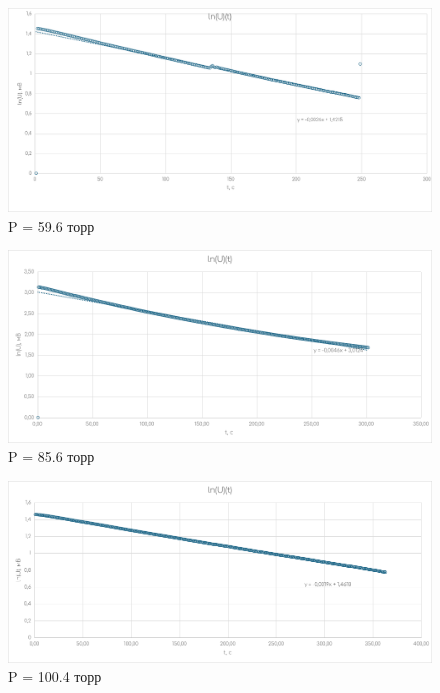 \documentclass[a4paper, 10pt, twocolumn]{article}
\begin{document}
\begin{figure}[H]
    \centering
    \includegraphics[width=1\linewidth]{graphs/pressure_59.6.png}
    \begin{center}
        \caption{P = 59.6 торр}
    \end{center}
\end{figure}

\begin{figure}[H]
    \centering
    \includegraphics[width=1\linewidth]{graphs/pressure_85.6.png}
    \begin{center}
        \caption{P = 85.6 торр}
    \end{center}
\end{figure}

\begin{figure}[H]
    \centering
    \includegraphics[width=1\linewidth]{graphs/pressure_100.4.png}
    \begin{center}
        \caption{P = 100.4 торр}
    \end{center}
\end{figure}
\end{document}
